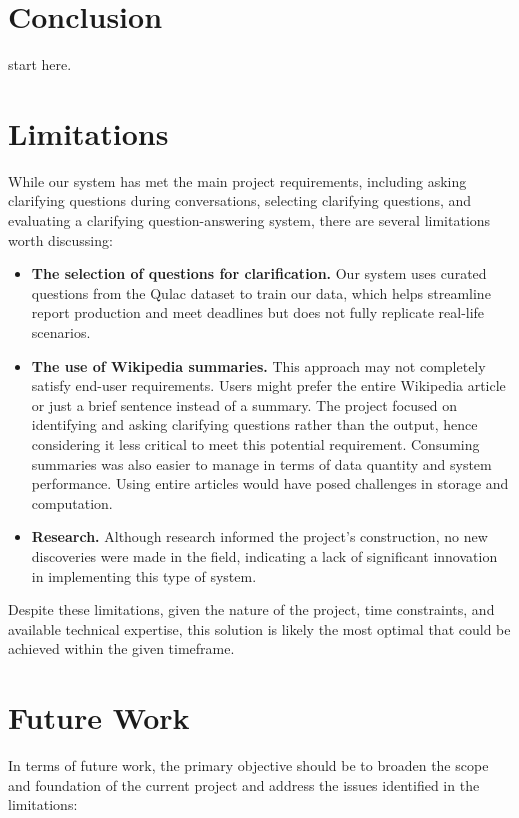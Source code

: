 \documentclass[11pt]{article}
\begin{document}
\section{Conclusion}
start here.

\section*{Limitations}

While our system has met the main project requirements, including asking clarifying questions during conversations, selecting clarifying questions, and evaluating a clarifying question-answering system, there are several limitations worth discussing:

\begin{itemize}
    \item \textbf{The selection of questions for clarification.} Our system uses curated questions from the Qulac dataset to train our data, which helps streamline report production and meet deadlines but does not fully replicate real-life scenarios.
    
    \item \textbf{The use of Wikipedia summaries.} This approach may not completely satisfy end-user requirements. Users might prefer the entire Wikipedia article or just a brief sentence instead of a summary. The project focused on identifying and asking clarifying questions rather than the output, hence considering it less critical to meet this potential requirement. Consuming summaries was also easier to manage in terms of data quantity and system performance. Using entire articles would have posed challenges in storage and computation.
    
    \item \textbf{Research.} Although research informed the project's construction, no new discoveries were made in the field, indicating a lack of significant innovation in implementing this type of system.
\end{itemize}

Despite these limitations, given the nature of the project, time constraints, and available technical expertise, this solution is likely the most optimal that could be achieved within the given timeframe.

\section*{Future Work}

In terms of future work, the primary objective should be to broaden the scope and foundation of the current project and address the issues identified in the limitations:
\end{document}
